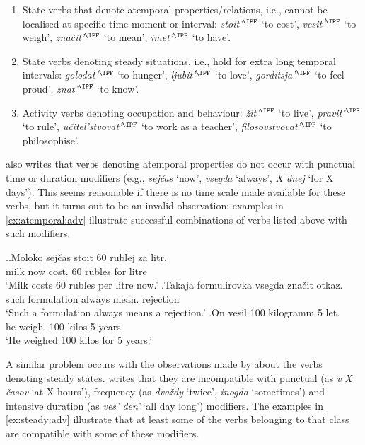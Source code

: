 \begin{enumerate}
\item State verbs that denote atemporal properties/relations, i.e., cannot be localised at specific time moment or interval: \textit{stoit'}$^{\IPF}$ `to cost', \textit{vesit'}$^{\IPF}$ `to weigh', \textit{zna\v{c}it'}$^{\IPF}$ `to mean', \textit{imet'}$^{\IPF}$ `to have'.
\item State verbs denoting steady situations,  i.e., hold for extra long temporal intervals: \textit{golodat'}$^{\IPF}$ `to hunger', \textit{ljubit'}$^{\IPF}$ `to love', \textit{gorditsja'}$^{\IPF}$ `to feel proud', \textit{znat'}$^{\IPF}$ `to know'.
\item Activity verbs denoting occupation and behaviour: \textit{\v{z}it'}$^{\IPF}$ `to live', \textit{pravit'}$^{\IPF}$ `to rule', \textit{u\v{c}itel'stvovat'}$^{\IPF}$ `to work as a teacher', \textit{filosovstvovat'}$^{\IPF}$ `to philosophise'.
\end{enumerate}

\citet{Paducheva:96} also writes that verbs denoting atemporal properties do not occur with punctual time or duration modifiers (e.g., \textit{sej\v{c}as} `now', \textit{vsegda} `always', \textit{X dnej} `for X days'). This seems reasonable if there is no time scale made available for these verbs, but it turns out to be an invalid observation: examples in \ref{ex:atemporal:adv} illustrate successful combinations of verbs listed above with such modifiers.


\ex.\label{ex:atemporal:adv}\ag.Moloko sej\v{c}as stoit 60 rublej za litr.\\
milk now cost. 60 rubles for litre\\
\trans `Milk costs 60 rubles per litre now.'
\bg.Takaja formulirovka vsegda zna\v{c}it otkaz.\\
such formulation always mean. rejection\\
\trans `Such a formulation always means a rejection.'
\bg.On vesil 100 kilogramm 5 let.\\
he weigh. 100 kilos 5 years\\
\trans `He weighed 100 kilos for 5 years.'

A similar problem occurs with the observations made by \citet{Paducheva:96} about the verbs denoting steady states. \citet{Paducheva:96} writes that they are incompatible with punctual (as \textit{v X \v{c}asov} `at X hours'), frequency (as \textit{dva\v{z}dy} `twice', \textit{inogda} `sometimes') and intensive duration  (as \textit{ves' den'} `all day long') modifiers. The examples in \ref{ex:steady:adv} illustrate that at least some of the verbs belonging to that class are compatible with some of these modifiers.

